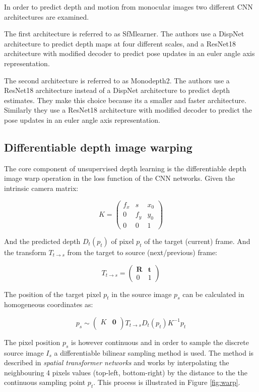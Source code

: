In order to predict depth and motion from monocular images two different CNN architectures are examined.

The first architecture is referred to as SfMlearner\cite{sfmlearner}. The authors use a DispNet\cite{dispnet} architecture to predict depth maps at four different scales, and a ResNet18\cite{resnet} architecture with modified decoder to predict pose updates in an euler angle axis representation.

The second architecture is referred to as Monodepth2\cite{monodepth2}. The authors use a ResNet18 architecture instead of a DispNet architecture to predict depth estimates. They make this choice because its a smaller and faster architecture. Similarly they use a ResNet18 architecture with modified decoder to predict the pose updates in an euler angle axis representation.

\newpage
\subsection{Differentiable depth image warping}
\label{sec:diffwarp}

The core component of unsupervised depth learning is the differentiable depth image warp operation in the loss function of the CNN networks. Given the intrinsic camera matrix:

\[
K = 
\begin{pmatrix}
f_x & s & x_0 \\
0 & f_y & y_0 \\
0 & 0   & 1
\end{pmatrix}
\]

And the predicted depth $ D_t(p_t) $ of pixel $ p_t $ of the target (current) frame. And the transform $ T_{t \rightarrow s} $ from the target to source (next/previous) frame:

\[
T_{t \rightarrow s} =
\begin{pmatrix}
\textbf{R} & \textbf{t} \\
0 & 1
\end{pmatrix}
\]

The position of the target pixel $ p_t $ in the source image $ p_s $ can be calculated in homogeneous coordinates as:

\[
p_s \sim 
\begin{pmatrix}
K  & \textbf{0} \\
\end{pmatrix}
T_{t \rightarrow s} D_t(p_t) K^{-1} p_t 
\]

The pixel position $ p_s $ is however continuous and in order to sample the discrete source image $ I_s $ a differentiable bilinear sampling method is used. The method is described in \textit{spatial transformer networks}\cite{spatialtransformernetworks} and works by interpolating the neighbouring 4 pixels values (top-left, bottom-right) by the distance to the the continuous sampling point $ p_t $. This process is illustrated in Figure \ref{fig:warp}.


